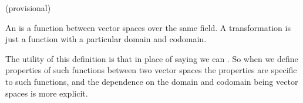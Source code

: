 

(provisional)

An  is a function between vector spaces over the same field.
A transformation is just a function with a particular domain and codomain.

The utility of this definition is that in place of saying  we can .
So when we define properties of such functions between two vector spaces the properties are specific to such functions, and the dependence on the domain and codomain being vector spaces is more explicit.

